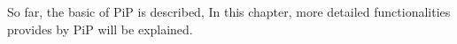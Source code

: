 
So far, the basic of PiP is described, In this chapter, more detailed
functionalities provides by PiP will be explained. 
